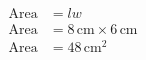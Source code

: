 \documentclass[12pt]{article}
\begin{document}
\hfill
\begin{minipage}{.4\textwidth}
  \begin{align*}
  \text{Area} &= lw \\
  \text{Area} &= 8 \,\text{cm} \times 6 \,\text{cm} \\
  \text{Area} &= 48 \,\text{cm}^2
  \end{align*}
\end{minipage}
\par\vspace{1cm}
\end{document}
